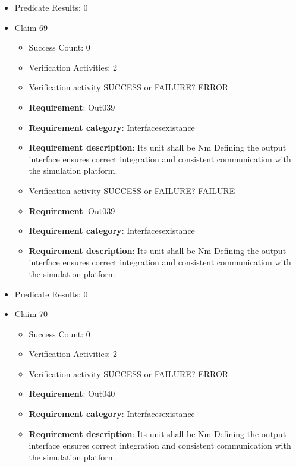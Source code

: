 \documentclass{article}
\begin{document}
\begin{itemize}
\begin{itemize}
				\end{itemize}
				
									    
				\item Predicate Results: 0

  				  \item Claim 69
				\begin{itemize}
			    	\item Success Count: 0 
			    	\item Verification Activities: 2
					\item Verification activity SUCCESS or FAILURE? ERROR
		
						\item \textbf{Requirement}: Out039 
						\item \textbf{Requirement category}: Interfacesexistance 
						\item \textbf{Requirement description}: Its unit shall be Nm Defining the output interface ensures correct integration and consistent communication with the simulation platform.
					
					\item Verification activity SUCCESS or FAILURE? FAILURE
		
						\item \textbf{Requirement}: Out039 
						\item \textbf{Requirement category}: Interfacesexistance 
						\item \textbf{Requirement description}: Its unit shall be Nm Defining the output interface ensures correct integration and consistent communication with the simulation platform.
					
				\end{itemize}
				
									    
				\item Predicate Results: 0

  				  \item Claim 70
				\begin{itemize}
			    	\item Success Count: 0 
			    	\item Verification Activities: 2
					\item Verification activity SUCCESS or FAILURE? ERROR
		
						\item \textbf{Requirement}: Out040 
						\item \textbf{Requirement category}: Interfacesexistance 
						\item \textbf{Requirement description}: Its unit shall be Nm Defining the output interface ensures correct integration and consistent communication with the simulation platform.
					

\end{itemize}
\end{itemize}
\end{document}
